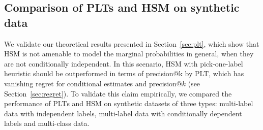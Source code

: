 \documentclass{article}
\newcommand{\Algo}[1]{\textsc{#1}}
\begin{document}

\subsection{Comparison of PLTs and HSM on synthetic data}
\label{sec:empirical-synthetic}



We validate our theoretical results presented in Section~\ref{sec:plt}, which show that  \Algo{HSM} is not amenable to model the marginal probabilities in general, when they are not conditionally independent. In this scenario, \Algo{HSM} with pick-one-label heuristic should be outperformed in terms of precision@k by \Algo{PLT}, which has vanishing regret for conditional estimates and precision@$k$ (see Section~\ref{sec:regret}). To validate this claim empirically, we compared the performance of \Algo{PLT}s and \Algo{HSM} on synthetic datasets of three types: multi-label data with independent labels, multi-label data with conditionally dependent labels and multi-class data. 
\end{document}
